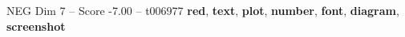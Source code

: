 \begin{textsample}{NEG Dim 7 – Score -7.00 – t006977}  \label{ex:f7_neg_030}
\textbf{red}, \textbf{text}, \textbf{plot}, \textbf{number}, \textbf{font}, \textbf{diagram}, \textbf{screenshot}

\end{textsample}
